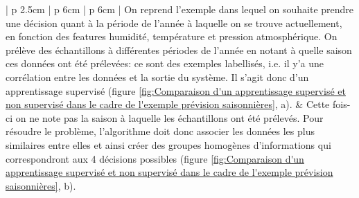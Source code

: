 \begin{table}[H]
\begin{tabular}{ | p {2.5cm} | p {6cm} | p {6cm} |}
	On reprend l'exemple dans lequel on souhaite prendre une décision quant à la période de l'année à laquelle on se trouve actuellement, en fonction des features humidité, température et pression atmosphérique. On prélève des échantillons à différentes périodes de l'année en notant à quelle saison ces données ont été prélevées: ce sont des exemples labellisés, i.e. il y'a une corrélation entre les données et la sortie du système. Il s'agit donc d'un apprentissage supervisé (figure \ref{fig:Comparaison d'un apprentissage supervisé et non supervisé dans le cadre de l'exemple prévision saisonnières}, a). &
	Cette fois-ci on ne note pas la saison à laquelle les échantillons ont été prélevés. Pour résoudre le problème, l'algorithme doit donc associer les données les plus similaires entre elles et ainsi créer des groupes homogènes d'informations qui correspondront aux 4 décisions possibles (figure \ref{fig:Comparaison d'un apprentissage supervisé et non supervisé dans le cadre de l'exemple prévision saisonnières}, b). \\
	\hline
	\end{tabular}
	\caption[Comparaison des différents modèles d'apprentissage]{Comparaison de l'apprentissage supervisé et non supervisé par des exemples}
	\label {tab: Comparaison des différentes méthodes d'apprentissage}
\end{table}

